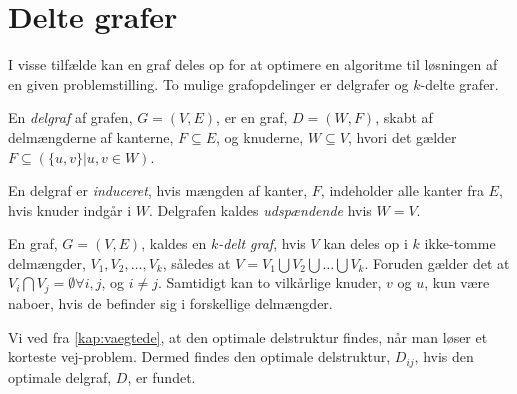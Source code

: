 \section{Delte grafer}
I visse tilfælde kan en graf deles op for at optimere en algoritme til løsningen af en given problemstilling.
To mulige grafopdelinger er delgrafer og $k$-delte grafer.

\begin{defn}[Delgraf] \label{defn:delgraf} %
En \emph{delgraf} af grafen, $G= (V,E)$, er en graf, $D = (W,F)$, skabt af delmængderne af kanterne, $F \subseteq E$, og knuderne, $W \subseteq V$, hvori det gælder $F \subseteq (\{u,v\} | u,v \in W)$.
\end{defn}

En delgraf er \emph{induceret}, hvis mængden af kanter, $F$, indeholder alle kanter fra $E$, hvis knuder indgår i $W$.
Delgrafen kaldes \emph{udspændende} hvis $W=V$. 

\begin{defn} \label{defn:k-delt} %
En graf, $G = (V, E)$, kaldes en \emph{$k$-delt graf}, hvis $V$ kan deles op i $k$ ikke-tomme delmængder, $V_1, V_2,\dotsc, V_k$, således at $V= V_1 \bigcup V_2 \bigcup \dotsc \bigcup V_k$. Foruden gælder det at $V_i \bigcap V_j  = \emptyset \forall i,j$, og $i\neq j$. Samtidigt kan to vilkårlige knuder, $v$ og $u$, kun være naboer, hvis de befinder sig i forskellige delmængder. 
\end{defn}

Vi ved fra \autoref{kap:vaegtede}, at den optimale delstruktur findes, når man løser et korteste vej-problem. Dermed findes den optimale delstruktur, $D_{ij}$, hvis den optimale delgraf, $D$, er fundet.



